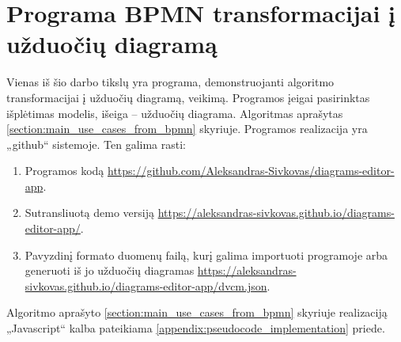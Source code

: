 \section{Programa BPMN transformacijai į užduočių diagramą}


Vienas iš šio darbo tikslų yra programa, demonstruojanti algoritmo \BPMN{} transformacijai į užduočių diagramą, veikimą. Programos įeigai pasirinktas \BPMN{} išplėtimas \DVCM{} modelis, išeiga – užduočių diagrama. Algoritmas aprašytas \ref{section:main_use_cases_from_bpmn} skyriuje. Programos realizacija yra „github“ sistemoje. Ten galima rasti:
\begin{enumerate}
  \item Programos kodą \href{https://github.com/Aleksandras-Sivkovas/diagrams-editor-app}{https://github.com/Aleksandras-Sivkovas/diagrams-editor-app}.
  \item Sutransliuotą demo versiją \href{https://aleksandras-sivkovas.github.io/diagrams-editor-app/}{https://aleksandras-sivkovas.github.io/diagrams-editor-app/}.
  \item Pavyzdinį \JSON{} formato duomenų failą, kurį galima importuoti programoje arba generuoti iš jo užduočių diagramas \href{https://aleksandras-sivkovas.github.io/diagrams-editor-app/dvcm.json}{https://aleksandras-sivkovas.github.io/diagrams-editor-app/dvcm.json}.
\end{enumerate}
Algoritmo aprašyto \ref{section:main_use_cases_from_bpmn} skyriuje realizaciją „Javascript“ kalba pateikiama \ref{appendix:pseudocode_implementation} priede.




